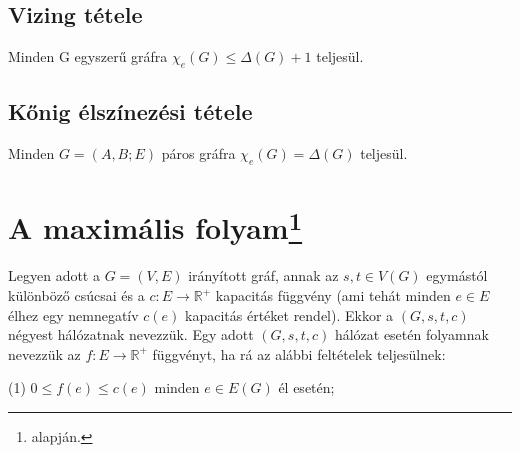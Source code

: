 \documentclass[12pt,a4paper,twoside]{report}
\begin{document}
\subsection{Vizing tétele}
Minden G egyszerű gráfra $\chi_e(G) \leq \Delta(G) + 1$ teljesül.
\subsection{Kőnig élszínezési tétele}
Minden $G = (A, B; E)$ páros gráfra $\chi_e(G) = \Delta(G)$ teljesül.
\section{A maximális folyam\protect\footnote{\cite{hj} alapján.}}
\df
Legyen adott a $G = (V, E)$ irányított gráf, annak az $s,t\in V(G)$
egymástól különböző csúcsai és a $c : E \rightarrow \mathbb{R}^+$ kapacitás függvény (ami tehát minden $e\in E$ élhez egy nemnegatív $c(e)$ kapacitás értéket rendel). Ekkor a $(G, s,t, c)$ négyest hálózatnak nevezzük.
\df 
Egy adott $(G, s,t, c)$ hálózat esetén folyamnak nevezzük az $f : E \rightarrow \mathbb{R}^+$ függvényt, ha rá az alábbi feltételek teljesülnek:

(1) $0 \leq f (e) \leq c(e)$ minden $e \in E(G)$ él esetén;
\end{document}
